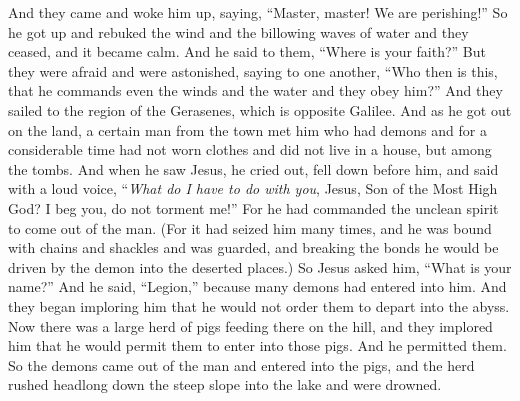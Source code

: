 \begin{biblechapter}
\verse And they came and woke him up, saying, “Master, master! We are perishing!” So he got up and rebuked the wind and the billowing waves of water and they ceased, and it became calm.
\verse And he said to them, “Where is your faith?” But they were afraid and were astonished, saying to one another, “Who then is this, that he commands even the winds and the water and they obey him?”
 And they sailed to the region of the Gerasenes, which is opposite Galilee.
\verse And as he got out on the land, a certain man from the town met him who had demons and for a considerable time had not worn clothes and did not live in a house, but among the tombs.
\verse And when he saw Jesus, he cried out, fell down before him, and said with a loud voice, “\textit{What do I have to do with you}, Jesus, Son of the Most High God? I beg you, do not torment me!”
\verse For he had commanded the unclean spirit to come out of the man. (For it had seized him many times, and he was bound with chains and shackles and was guarded, and breaking the bonds he would be driven by the demon into the deserted places.)
\verse So Jesus asked him, “What is your name?” And he said, “Legion,” because many demons had entered into him.
\verse And they began imploring him that he would not order them to depart into the abyss.
\verse Now there was a large herd of pigs feeding there on the hill, and they implored him that he would permit them to enter into those pigs. And he permitted them.
\verse So the demons came out of the man and entered into the pigs, and the herd rushed headlong down the steep slope into the lake and were drowned.

\end{biblechapter}
